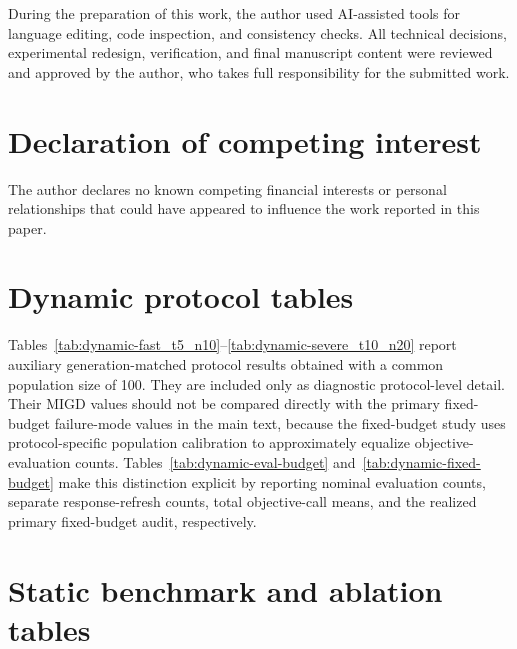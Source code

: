 \documentclass[preprint,12pt]{elsarticle}
\begin{document}
During the preparation of this work, the author used AI-assisted tools for language editing, code inspection, and consistency checks. All technical decisions, experimental redesign, verification, and final manuscript content were reviewed and approved by the author, who takes full responsibility for the submitted work.

\section*{Declaration of competing interest}

The author declares no known competing financial interests or personal relationships that could have appeared to influence the work reported in this paper.




\clearpage
\appendix

\section{Dynamic protocol tables}
\label{app:dynamic}

Tables~\ref{tab:dynamic-fast_t5_n10}--\ref{tab:dynamic-severe_t10_n20} report auxiliary generation-matched protocol results obtained with a common population size of 100. They are included only as diagnostic protocol-level detail. Their MIGD values should not be compared directly with the primary fixed-budget failure-mode values in the main text, because the fixed-budget study uses protocol-specific population calibration to approximately equalize objective-evaluation counts. Tables~\ref{tab:dynamic-eval-budget} and~\ref{tab:dynamic-fixed-budget} make this distinction explicit by reporting nominal evaluation counts, separate response-refresh counts, total objective-call means, and the realized primary fixed-budget audit, respectively.










\FloatBarrier
\clearpage

\section{Static benchmark and ablation tables}
\label{app:static}






\FloatBarrier
\end{document}

